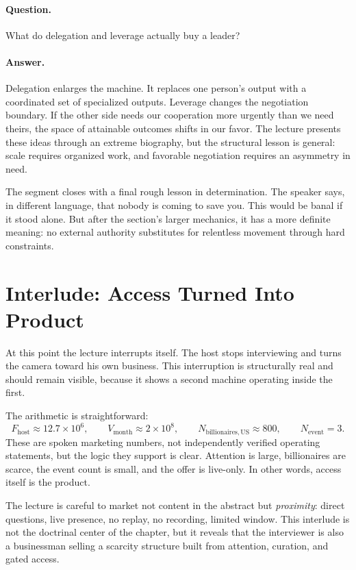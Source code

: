 \paragraph{Question.} What do delegation and leverage actually buy a leader?

\paragraph{Answer.} Delegation enlarges the machine. It replaces one person's output with a coordinated set of specialized outputs. Leverage changes the negotiation boundary. If the other side needs our cooperation more urgently than we need theirs, the space of attainable outcomes shifts in our favor. The lecture presents these ideas through an extreme biography, but the structural lesson is general: scale requires organized work, and favorable negotiation requires an asymmetry in need.

The segment closes with a final rough lesson in determination. The speaker says, in different language, that nobody is coming to save you. This would be banal if it stood alone. But after the section's larger mechanics, it has a more definite meaning: no external authority substitutes for relentless movement through hard constraints.

\section{Interlude: Access Turned Into Product}

At this point the lecture interrupts itself. The host stops interviewing and turns the camera toward his own business. This interruption is structurally real and should remain visible, because it shows a second machine operating inside the first.

The arithmetic is straightforward:
\begin{equation}
F_{\mathrm{host}}\approx 12.7\times 10^6, \qquad
V_{\mathrm{month}}\approx 2\times 10^8, \qquad
N_{\mathrm{billionaires,US}}\approx 800, \qquad
N_{\mathrm{event}}=3.
\end{equation}
These are spoken marketing numbers, not independently verified operating statements, but the logic they support is clear. Attention is large, billionaires are scarce, the event count is small, and the offer is live-only. In other words, access itself is the product.

The lecture is careful to market not content in the abstract but \emph{proximity}: direct questions, live presence, no replay, no recording, limited window. This interlude is not the doctrinal center of the chapter, but it reveals that the interviewer is also a businessman selling a scarcity structure built from attention, curation, and gated access.


